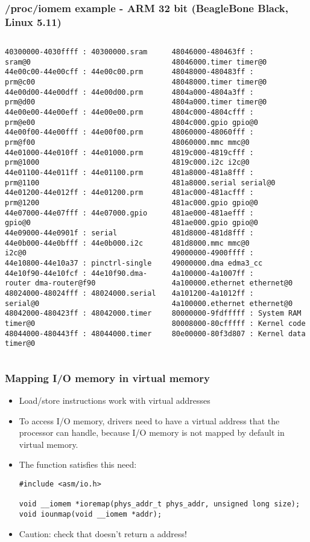 \begin{frame}[fragile]
  \frametitle{/proc/iomem example - ARM 32 bit (BeagleBone Black, Linux 5.11)}
  \tiny
  \begin{columns}
  \begin{verbatim}
40300000-4030ffff : 40300000.sram sram@0
44e00c00-44e00cff : 44e00c00.prm prm@c00
44e00d00-44e00dff : 44e00d00.prm prm@d00
44e00e00-44e00eff : 44e00e00.prm prm@e00
44e00f00-44e00fff : 44e00f00.prm prm@f00
44e01000-44e010ff : 44e01000.prm prm@1000
44e01100-44e011ff : 44e01100.prm prm@1100
44e01200-44e012ff : 44e01200.prm prm@1200
44e07000-44e07fff : 44e07000.gpio gpio@0
44e09000-44e0901f : serial
44e0b000-44e0bfff : 44e0b000.i2c i2c@0
44e10800-44e10a37 : pinctrl-single
44e10f90-44e10fcf : 44e10f90.dma-router dma-router@f90
48024000-48024fff : 48024000.serial serial@0
48042000-480423ff : 48042000.timer timer@0
48044000-480443ff : 48044000.timer timer@0
\end{verbatim}
  \begin{verbatim}
48046000-480463ff : 48046000.timer timer@0
48048000-480483ff : 48048000.timer timer@0
4804a000-4804a3ff : 4804a000.timer timer@0
4804c000-4804cfff : 4804c000.gpio gpio@0
48060000-48060fff : 48060000.mmc mmc@0
4819c000-4819cfff : 4819c000.i2c i2c@0
481a8000-481a8fff : 481a8000.serial serial@0
481ac000-481acfff : 481ac000.gpio gpio@0
481ae000-481aefff : 481ae000.gpio gpio@0
481d8000-481d8fff : 481d8000.mmc mmc@0
49000000-4900ffff : 49000000.dma edma3_cc
4a100000-4a1007ff : 4a100000.ethernet ethernet@0
4a101200-4a1012ff : 4a100000.ethernet ethernet@0
80000000-9fdfffff : System RAM
80008000-80cfffff : Kernel code
80e00000-80f3d807 : Kernel data
\end{verbatim}
  \end{columns}
\end{frame}

\begin{frame}[fragile]
  \frametitle{Mapping I/O memory in virtual memory}
  \begin{itemize}
  \item Load/store instructions work with virtual addresses
  \item To access I/O memory, drivers need to have a virtual address
    that the processor can handle, because I/O memory is not mapped by
    default in virtual memory.
  \item The  function satisfies this need:
\begin{verbatim}
#include <asm/io.h>

void __iomem *ioremap(phys_addr_t phys_addr, unsigned long size);
void iounmap(void __iomem *addr);
\end{verbatim}
  \item Caution: check that  doesn't return a  address!
  \end{itemize}
\end{frame}

